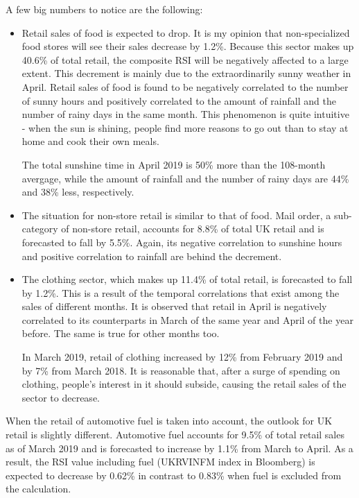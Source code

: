 \documentclass[a4paper,11pt,pdftex,twoside,titlepage]{article}
\begin{document}
A few big numbers to notice are the following:
\begin{itemize}
\item Retail sales of food is expected to drop. It is my opinion that
  non-specialized food stores will see their sales decrease by
  1.2\%. Because this sector makes up 40.6\% of total retail, the
  composite RSI will be negatively affected to a large extent.
  This decrement is mainly due to the extraordinarily sunny weather in
  April. Retail sales of food is found to be negatively correlated to
  the number of sunny hours and positively correlated to the amount of
  rainfall and the number of rainy days in the same month.
  This phenomenon is quite intuitive - when the sun is shining, people
  find more reasons to go out than to stay at home and cook their own
  meals.

  The total sunshine time in April 2019 is 50\% more than the
  108-month avergage, while the amount of rainfall and the number of
  rainy days are 44\% and 38\% less, respectively.
  
\item The situation for non-store retail is similar to that of
  food. Mail order, a sub-category of non-store retail, accounts for
  8.8\% of total UK retail and is forecasted to fall by 5.5\%. Again,
  its negative correlation to sunshine hours and positive correlation
  to rainfall are behind the decrement.

\item The clothing sector, which makes up 11.4\% of total retail, is
  forecasted to fall by 1.2\%. This is a result of the temporal
  correlations that exist among the sales of different months. It is
  observed that retail in April is negatively correlated to its
  counterparts in March of the same year and April of the year
  before. The same is true for other months too.

  In March 2019, retail of clothing increased by 12\% from February
  2019 and by 7\% from March 2018. It is reasonable that, after a
  surge of spending on clothing, people's interest in it should
  subside, causing the retail sales of the sector to decrease.
\end{itemize}

When the retail of automotive fuel is taken into account, the outlook
for UK retail is slightly different. Automotive fuel accounts for
9.5\% of total retail sales as of March 2019 and is forecasted to
increase by 1.1\% from March to April. As a result, the RSI value
including fuel (UKRVINFM index in Bloomberg) is expected to decrease
by 0.62\% in contrast to 0.83\% when fuel is excluded from the
calculation.
\end{document}
